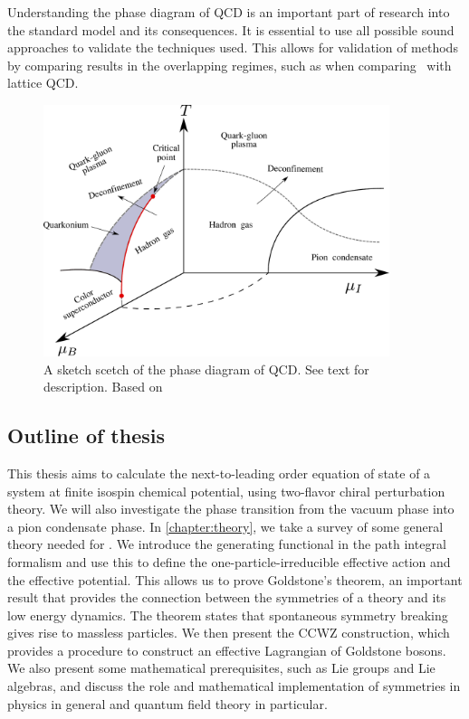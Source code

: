 Understanding the phase diagram of QCD is an important part of research into the standard model and its consequences.
It is essential to use all possible sound approaches to validate the techniques used.
This allows for validation of methods by comparing results in the overlapping regimes, such as when comparing \chpt\ with lattice QCD.

\begin{figure}[h]
    \centering
    \includegraphics[width=0.9\textwidth]{figurer/phase_diagram2.pdf}
    \caption{A sketch scetch of the phase diagram of QCD. See text for description. Based on~\cite{from_hadrons_to_quarks,
    Brandt:QCD_phase_diagram_with_isospin_chemical_potential,Brandt:QCD_phase_diagram_for_nonzero_isospin-asymmetry,Fukushima:The_phase_diagram_of_dense_QCD,mannarelli:meson_condensation}
    }
    \label{fig:phase diag qcd}
\end{figure}

\subsection*{Outline of thesis}
This thesis aims to calculate the next-to-leading order equation of state of a system at finite isospin chemical potential, using two-flavor chiral perturbation theory.
We will also investigate the phase transition from the vacuum phase into a pion condensate phase.
In \autoref{chapter:theory}, we take a survey of some general theory needed for \chpt.
We introduce the generating functional in the path integral formalism and use this to define the one-particle-irreducible effective action and the effective potential.
This allows us to prove Goldstone's theorem, an important result that provides the connection between the symmetries of a theory and its low energy dynamics.
The theorem states that spontaneous symmetry breaking gives rise to massless particles.
We then present the CCWZ construction, which provides a procedure to construct an effective Lagrangian of Goldstone bosons.
We also present some mathematical prerequisites, such as Lie groups and Lie algebras, and discuss the role and mathematical implementation of symmetries in physics in general and quantum field theory in particular.

